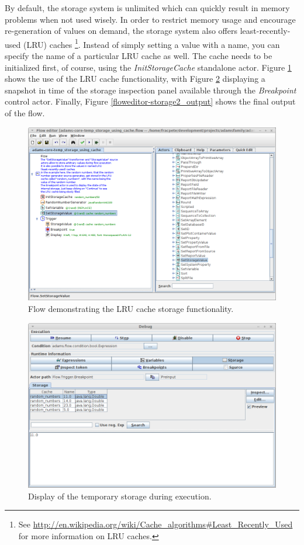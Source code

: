 By default, the storage system is unlimited which can quickly result in memory
problems when not used wisely. In order to restrict memory usage and encourage
re-generation of values on demand, the storage system also offers
least-recently-used (LRU) caches \footnote{See
\url{http://en.wikipedia.org/wiki/Cache_algorithms\#Least_Recently_Used}{} for
more information on LRU caches.}. Instead of simply setting a value with a name,
you can specify the name of a particular LRU cache as well. The cache needs to
be initialized first, of course, using the \textit{InitStorageCache} standalone
actor. Figure \ref{floweditor-storage2_flow} shows the use of the LRU cache
functionality, with Figure \ref{floweditor-storage2_inspectionpanel} displaying
a snapshot in time of the storage inspection panel available through the
\textit{Breakpoint} control actor. Finally, Figure
\ref{floweditor-storage2_output} shows the final output of the flow.

\begin{figure}[htb]
  \centering
  \includegraphics[width=12.0cm]{images/floweditor-storage2_flow.png}
  \caption{Flow demonstrating the LRU cache storage functionality.}
  \label{floweditor-storage2_flow}
\end{figure}

\begin{figure}[htb]
  \centering
  \includegraphics[width=12.0cm]{images/floweditor-storage2_inspectionpanel.png}
  \caption{Display of the temporary storage during execution.}
  \label{floweditor-storage2_inspectionpanel}
\end{figure}

